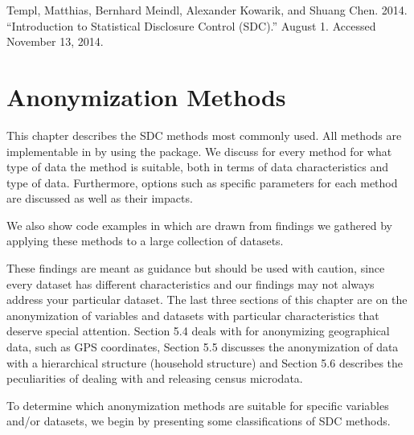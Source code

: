 \documentclass[letterpaper,10pt,english]{sphinxmanual}
\begin{document}
Templ, Matthias, Bernhard Meindl, Alexander Kowarik, and Shuang Chen.
2014. “Introduction to Statistical Disclosure Control (SDC).”
August 1. Accessed November 13, 2014.


\chapter{Anonymization Methods}
\label{\detokenize{anon_methods::doc}}\label{\detokenize{anon_methods:anonymization-methods}}
This chapter describes the SDC methods most commonly used. All methods
are implementable in  by using the  package. We discuss for
every method for what type of data the method is suitable, both in terms
of data characteristics and type of data. Furthermore, options such as
specific parameters for each method are discussed as well as their
impacts. %
\begin{footnote}[1]\sphinxAtStartFootnote
We also show code examples in  which are drawn from findings we
gathered by applying these methods to a large collection of datasets.
%
\end{footnote} These findings are meant as guidance but
should be used with caution, since every dataset has different
characteristics and our findings may not always address your particular
dataset. The last three sections of this chapter are on the
anonymization of variables and datasets with particular characteristics
that deserve special attention. Section 5.4 deals with for anonymizing
geographical data, such as GPS coordinates, Section 5.5 discusses the
anonymization of data with a hierarchical structure (household
structure) and Section 5.6 describes the peculiarities of dealing with
and releasing census microdata.

To determine which anonymization methods are suitable for specific
variables and/or datasets, we begin by presenting some classifications
of SDC methods.
\end{document}
